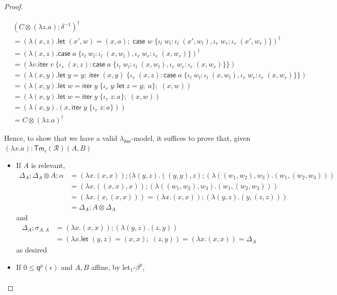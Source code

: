 \documentclass[acmsmall,screen,anonymous,review]{acmart}
\newcommand{\mc}[1]{\ensuremath{\mathcal{#1}}}
\newcommand{\ms}[1]{\ensuremath{\mathsf{#1}}}
\newcommand{\lto}{:}
\newcommand{\linl}[1]{\iota_l\;{#1}}
\newcommand{\linr}[1]{\iota_r\;{#1}}
\newcommand{\letexpr}[3]{\ensuremath{\ms{let}\;#1 = #2;\;#3}}
\newcommand{\caseexpr}[5]{\ms{case}\;#1\;\{\linl{#2} \lto #3, \linr{#4} \lto #5\}}
\newcommand{\liter}[3]{\ms{iter}\;#1\;\{ \linr{#2} \lto #3 \}}
\newcommand{\brle}[1]{{\textsf{#1}}}
\newcommand{\dmor}[1]{{\Delta}_{#1}}
\newcommand{\subiterexp}{\texorpdfstring{\(\lambda_{\ms{iter}}\)}{lambda-iter}}
\newcommand{\alquant}{\ms{q}}
\begin{document}
\begin{proof}
\begin{itemize}
  \begin{align*}
    &(C \otimes (\lambda z . a) ; \delta^{-1})^\dagger \\
    &= (\lambda (x, z) . \letexpr{(x', w)}{(x, a)}
      {\caseexpr{w}{w_l}{\linl{(x', w_l)}}{w_r}{\linr{(x', w_r)}}})^\dagger
    \\
    &= (\lambda (x, z) . \caseexpr{a}{w_l}{\linl{(x, w_l)}}{w_r}{\linr{(x, w_r)}})^\dagger
    \\
    &= (\lambda v . \liter{v}{(x, z)}{\caseexpr{a}{w_l}{\linl{(x, w_l)}}{w_r}{\linr{(x, w_r)}}})
    \\
    &= (\lambda (x, y) . \letexpr{y}{y}{\liter{(x, y)}{(x, z)}{\caseexpr{a}{w_l}
      {\linl{(x, w_l)}}{w_r}{\linr{(x, w_r)}}}}) \\
    &= (\lambda (x, y) . \letexpr{w}{\liter{y}{y}{\letexpr{z}{y}{a}}}{(x, w)}) \\
    &= (\lambda (x, y) . \letexpr{w}{\liter{y}{z}{a}}{(x, w)}) \\
    &= (\lambda (x, y) . (x, \liter{y}{z}{a})) \\
    &= C \otimes (\lambda z . a)^\dagger
  \end{align*}
\end{itemize}
Hence, to show that we have a valid \subiterexp{}-model, it suffices to prove that, given $(\lambda
x.a) : \ms{Tm}_\epsilon(\mc{R})(A, B)$
\begin{itemize}
  \item If $A$ is relevant,
  \begin{align*}
  \dmor{A} ; \dmor{A} \otimes A ; \alpha
  &= (\lambda x. (x, x)) 
    ; (\lambda (y, z) . ((y, y), z) 
    ; (\lambda ((w_1, w_2), w_3) . (w_1, (w_2, w_3))) \\
  &= (\lambda x. ((x, x), x)) ; (\lambda ((w_1, w_2), w_3) . (w_1, (w_2, w_3))) \\
  &= (\lambda x. (x, (x, x))) = (\lambda x. (x, x)) ; (\lambda (y, z) . (y, (z, z))) \\
  &= \dmor{A} ; A \otimes \dmor{A}
  \end{align*}
  and
  \begin{align*}
  \dmor{A} ; \sigma_{A, A} &= (\lambda x. (x, x)) ; (\lambda (y, z) . (z, y)) \\
  &= (\lambda x. \letexpr{(y, z)}{(x, x)}{(z, y)}) = (\lambda x.(x, x)) = \dmor{A}
  \end{align*}
  as desired
  \item If $0 \leq \alquant^p(\epsilon)$ and $A, B$ affine, by \brle{let$_1$-$\beta^p$}, 
  \begin{align*}

\end{align*}
\end{itemize}
\end{proof}
\end{document}
